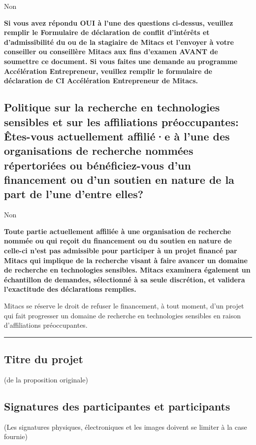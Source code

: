 \documentclass{mitacs-stagiaire}
\begin{document}
Non

{\bfseries
Si vous avez répondu \og{}OUI\fg{} à l'une des questions ci-dessus, veuillez remplir le Formulaire de déclaration de conflit d'intérêts et d'admissibilité du ou de la stagiaire de Mitacs et l'envoyer à votre conseiller ou conseillère Mitacs aux fins d'examen AVANT de soumettre ce document. Si vous faites une demande au programme Accélération Entrepreneur, veuillez remplir le formulaire de déclaration de CI Accélération Entrepreneur de Mitacs.
}

\subsection{Politique sur la recherche en technologies sensibles et sur les affiliations préoccupantes:
Êtes-vous actuellement affilié·e à l'une des organisations de recherche nommées répertoriées ou bénéficiez-vous d'un financement ou d'un soutien en nature de la part de l'une d'entre elles?}

Non

{\bfseries
Toute partie actuellement affiliée à une organisation de recherche nommée ou qui reçoit du financement ou du soutien en nature de celle-ci n'est pas admissible pour participer à un projet financé par Mitacs qui implique de la recherche visant à faire avancer un domaine de recherche en technologies sensibles. Mitacs examinera également un échantillon de demandes, sélectionné à sa seule discrétion, et validera l'exactitude des déclarations remplies.

Mitacs se réserve le droit de refuser le financement, à tout moment, d'un projet qui fait progresser un domaine de recherche en technologies sensibles en raison d'affiliations préoccupantes.
}

\newpage



\rule{6in}{2pt}

\subsection{Titre du projet}                                                         
        (de la proposition originale)
        
\titreprojet

\subsection{Signatures des participantes et participants\oblig}
	    (Les signatures physiques, électroniques et les images doivent se limiter à la case fournie)
\end{document}
